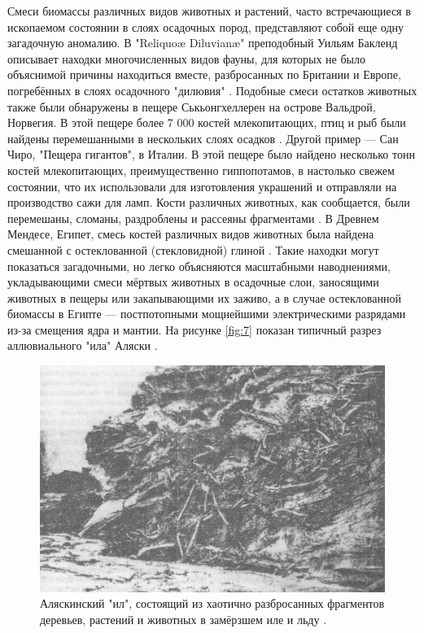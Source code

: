 \documentclass[10pt,twocolumn,letterpaper]{article}
\begin{document}
Смеси биомассы различных видов животных и растений, часто встречающиеся в ископаемом состоянии в слоях осадочных пород, представляют собой еще одну загадочную аномалию. В "Reliquoæ Diluvianæ" преподобный Уильям Бакленд описывает находки многочисленных видов фауны, для которых не было объяснимой причины находиться вместе, разбросанных по Британии и Европе, погребённых в слоях осадочного "дилювия" \cite{58}. Подобные смеси остатков животных также были обнаружены в пещере Ськьонгхеллерен на острове Вальдрой, Норвегия. В этой пещере более 7 000 костей млекопитающих, птиц и рыб были найдены перемешанными в нескольких слоях осадков \cite{59}. Другой пример — Сан Чиро, "Пещера гигантов", в Италии. В этой пещере было найдено несколько тонн костей млекопитающих, преимущественно гиппопотамов, в настолько свежем состоянии, что их использовали для изготовления украшений и отправляли на производство сажи для ламп. Кости различных животных, как сообщается, были перемешаны, сломаны, раздроблены и рассеяны фрагментами \cite{60,61}. В Древнем Мендесе, Египет, смесь костей различных видов животных была найдена смешанной с остеклованной (стекловидной) глиной \cite{57}. Такие находки могут показаться загадочными, но легко объясняются масштабными наводнениями, укладывающими смеси мёртвых животных в осадочные слои, заносящими животных в пещеры или закапывающими их заживо, а в случае остеклованной биомассы в Египте — постпотопными мощнейшими электрическими разрядами из-за смещения ядра и мантии. На рисунке \ref{fig:7} показан типичный разрез аллювиального "ила" Аляски \cite{56}.

\begin{figure}[t]
\begin{center}
   \includegraphics[width=1\linewidth]{muck-crop.jpeg}
\end{center}
   \caption{Аляскинский "ил", состоящий из хаотично разбросанных фрагментов деревьев, растений и животных в замёрзшем иле и льду \cite{146}.}
\label{fig:7}
\label{fig:onecol}
\end{figure}
\end{document}
